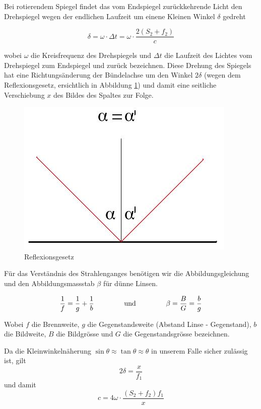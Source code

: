Bei rotierendem Spiegel  findet das vom Endspiegel  zur\"uckkehrende Licht den
Drehspiegel wegen  der endlichen  Laufzeit um  einene Kleinen  Winkel $\delta$
gedreht

\begin{equation}
    \delta = \omega \cdot \Delta t = \omega \cdot \frac{2(S_2 + f_2)}{c}
    \label{eq:delta}
\end{equation}

wobei $\omega$ die Kreisfrequenz des  Drehspiegels und $\Delta t$ die Laufzeit
des Lichtes  vom Drehspiegel  zum Endspiegel  und zur\"uck  bezeichnen.  Diese
Drehung  des  Spiegels  hat  eine  Richtungs\"anderung  der  B\"undelachse  um
den  Winkel $2\delta$  (wegen dem  Reflexionsgesetz, ersichtlich  in Abbildung
\ref{fig:reflexionsgesetz})  und damit  eine  seitliche  Verschiebung $x$  des
Bildes des Spaltes zur Folge.

\begin{figure}[H]
    \center
    \includegraphics[width=.4\textwidth]{images/reflexionsgesetz.jpg}
    \caption{Reflexionsgesetz}
    \label{fig:reflexionsgesetz}
\end{figure}

F\"ur   das    Verst\"andnis   des   Strahlenganges   ben\"otigen    wir   die
Abbildungsgleichung und den Abbildungsmassstab $\beta$ f\"ur d\"unne Linsen.

\begin{equation}
    \frac{1}{f} = \frac{1}{g} + \frac{1}{b}
    \hspace{15mm}\textrm{und}\hspace{15mm}
    \beta = \frac{B}{G} = \frac{b}{g}
    \label{eq:optik}
\end{equation}

Wobei  $f$  die   Brennweite,  $g$  die  Gegenstandsweite   (Abstand  Linse  -
Gegenstand),   $b$  die   Bildweite,  $B$   die  Bildgr\"osse   und  $G$   die
Gegenstandsgr\"osse bezeichnen.

Da die Kleinwinkeln\"aherung $\sin\theta \approx \tan\theta \approx \theta$ in
unserem Falle sicher zul\"assig ist, gilt
\begin{equation}
    2\delta = \frac{x}{f_1}
\end{equation}
und damit
\begin{equation}
    c = 4\omega \cdot \frac{(S_2 + f_2)f_1}{x}
\end{equation}

